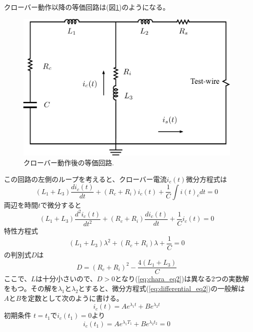 \documentclass[book,openany]{jlreq}
\theoremstyle{definition}
\begin{document}
クローバー動作以降の等価回路は(図\ref{fig:AfterCrowbar})のようになる。
%
\begin{figure}[htbp]
  \begin{center}
    \includegraphics[width=12cm]{figs/AfterCRB.pdf}
    \caption{クローバー動作後の等価回路.}
    \label{fig:AfterCrowbar}
  \end{center}
\end{figure}
%
この回路の左側のループを考えると、クローバー電流$i_c(t)$微分方程式は
%
\begin{equation}
  (L_1+L_3) \frac{di_c(t)}{dt} + (R_c+R_i) i_c(t) + \frac{1}{C} \int i(t)_c dt = 0
\end{equation}
%
両辺を時間$t$で微分すると
%
\begin{equation}
  (L_1+L_3)\frac{d^2i_c(t)}{dt^2} + (R_c+R_i) \frac{di_c(t)}{dt} + \frac{1}{C} i_c(t) = 0
  \label{eq:differential_eq2}
\end{equation}
%
特性方程式
%
\begin{equation}
  (L_1+L_3)\lambda^2 + (R_c+R_i)  \lambda + \frac{1}{C} = 0
  \label{eq:chara_eq2}
\end{equation}
%
の判別式$D$は
%
\begin{equation}
  D = (R_c+R_i)^2 -\frac{4 (L_1+L_3)}{C}
\end{equation}
%
ここで、$L$は十分小さいので、$D>0$となり(\ref{eq:chara_eq2})は異なる2つの実数解をもつ。その解を$\lambda_1$と$\lambda_2$とすると、微分方程式(\ref{eq:differential_eq2})の一般解は$A$と$B$を定数として次のように書ける。
%
\begin{equation}
  i_c(t) = A e^{\lambda_1 t} + B e^{\lambda_2 t}
\end{equation}
%
初期条件 $t=t_1$で$i_c(t_1)=0$より
%
\begin{equation}
  i_c(t_1) = A e^{\lambda_1 T_1} + B e^{\lambda_2 t_2} = 0
\end{equation}
\end{document}
